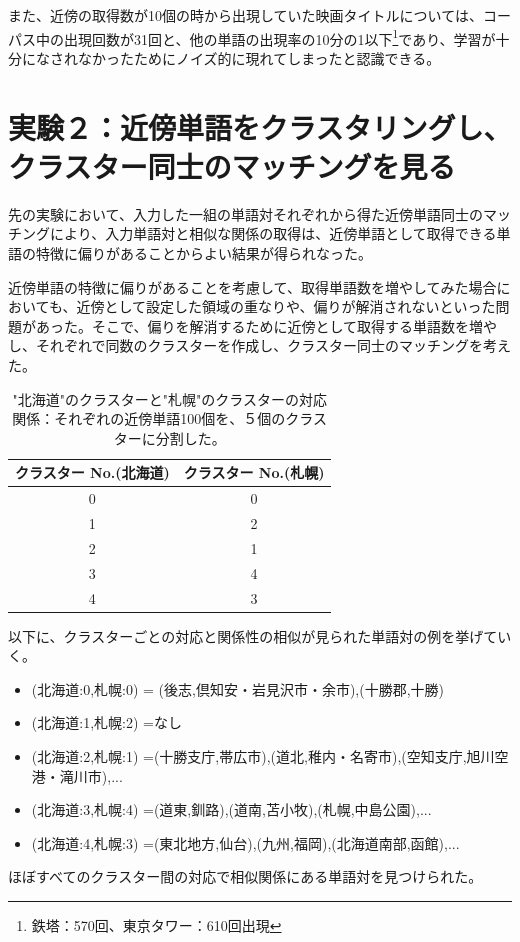 また、近傍の取得数が10個の時から出現していた映画タイトルについては、コーパス中の出現回数が31回と、他の単語の出現率の10分の1以下\footnote{鉄塔：570回、東京タワー：610回出現}であり、学習が十分になされなかったためにノイズ的に現れてしまったと認識できる。

\section{実験２：近傍単語をクラスタリングし、クラスター同士のマッチングを見る}
先の実験において、入力した一組の単語対それぞれから得た近傍単語同士のマッチングにより、入力単語対と相似な関係の取得は、近傍単語として取得できる単語の特徴に偏りがあることからよい結果が得られなった。

近傍単語の特徴に偏りがあることを考慮して、取得単語数を増やしてみた場合においても、近傍として設定した領域の重なりや、偏りが解消されないといった問題があった。そこで、偏りを解消するために近傍として取得する単語数を増やし、それぞれで同数のクラスターを作成し、クラスター同士のマッチングを考えた。

\begin{table}[!h]
  \caption["北海道"のクラスターと"札幌"のクラスターの対応関係]{"北海道"のクラスターと"札幌"のクラスターの対応関係：それぞれの近傍単語100個を、５個のクラスターに分割した。}
  \label{}
  \begin{center}
    \begin{tabular}{|c||c|} \hline
      クラスター No.(北海道) & クラスター No.(札幌) \\ \hline \hline
      0 & 0 \\
      1 & 2 \\
      2 & 1 \\
      3 & 4 \\
      4 & 3 \\ \hline
    \end{tabular}
  \end{center}
\end{table}
以下に、クラスターごとの対応と関係性の相似が見られた単語対の例を挙げていく。

\begin{itemize}
  \item (北海道:0,札幌:0) = (後志,倶知安・岩見沢市・余市),(十勝郡,十勝)
  \item (北海道:1,札幌:2) =なし
  \item (北海道:2,札幌:1) =(十勝支庁,帯広市),(道北,稚内・名寄市),(空知支庁,旭川空港・滝川市),...
  \item (北海道:3,札幌:4) =(道東,釧路),(道南,苫小牧),(札幌,中島公園),...
  \item (北海道:4,札幌:3) =(東北地方,仙台),(九州,福岡),(北海道南部,函館),...
\end{itemize}
ほぼすべてのクラスター間の対応で相似関係にある単語対を見つけられた。
